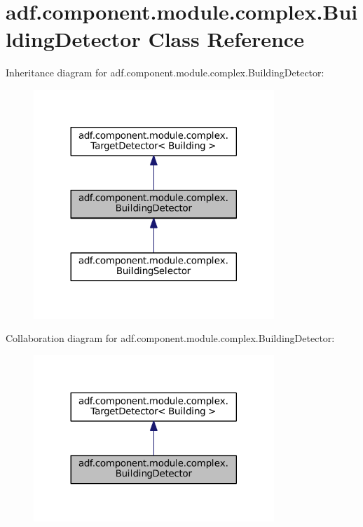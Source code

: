 \hypertarget{classadf_1_1component_1_1module_1_1complex_1_1BuildingDetector}{}\section{adf.\+component.\+module.\+complex.\+Building\+Detector Class Reference}
\label{classadf_1_1component_1_1module_1_1complex_1_1BuildingDetector}


Inheritance diagram for adf.\+component.\+module.\+complex.\+Building\+Detector\+:
\nopagebreak
\begin{figure}[H]
\begin{center}
\leavevmode
\includegraphics[width=257pt]{classadf_1_1component_1_1module_1_1complex_1_1BuildingDetector__inherit__graph}
\end{center}
\end{figure}


Collaboration diagram for adf.\+component.\+module.\+complex.\+Building\+Detector\+:
\nopagebreak
\begin{figure}[H]
\begin{center}
\leavevmode
\includegraphics[width=257pt]{classadf_1_1component_1_1module_1_1complex_1_1BuildingDetector__coll__graph}
\end{center}
\end{figure}
